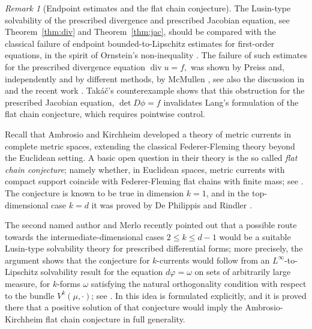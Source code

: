 \documentclass[11pt,a4paper]{article}
\theoremstyle{definition}
\theoremstyle{remark}
\newtheorem{rem}[thm]{Remark}
\begin{document}
\begin{rem}[Endpoint estimates and the flat chain conjecture]

The Lusin-type solvability of the prescribed divergence and prescribed Jacobian equation, see Theorem~\ref{thm:div} and Theorem~\ref{thm:jac}, should be compared with the classical failure of endpoint bounded-to-Lipschitz estimates for first-order equations, in the spirit of Ornstein's non-inequality \cite{Ornstein}.
The failure of such estimates for the prescribed divergence equation
$\operatorname{div} u = f,
$ was shown by Preiss \cite{Preiss1997} and, independently and by different methods, by McMullen \cite{McMullen1998}, see also the discussion in \cite{DFT03} and the recent work \cite{DePauw2026}. 
Tak\'a\v{c}'s counterexample \cite{Takac} shows that this obstruction for the prescribed Jacobian equation, $\det D\phi = f$ invalidates Lang's formulation of the flat chain conjecture, which requires pointwise control.

Recall that Ambrosio and Kirchheim \cite{AK00} developed a theory of metric currents in complete metric spaces, extending the classical Federer-Fleming theory beyond the Euclidean setting.
A basic open question in their theory is the so called \emph{flat chain conjecture}; namely whether, in Euclidean spaces, metric currents with compact support coincide with Federer-Fleming flat chains with finite mass; see \cite[Section~11]{AK00}.
The conjecture is known to be true in dimension $k=1$, and in the top-dimensional case $k=d$ it was proved by De Philippis and Rindler \cite[Theorem~1.15]{DPR}.

The second named author and Merlo recently pointed out that a possible route towards the intermediate-dimensional cases $2\le k\le d-1$ would be a suitable Lusin-type solvability theory for prescribed differential forms; more precisely, the argument shows that the conjecture for $k$-currents would follow from an $L^\infty$-to-Lipschitz solvability result for the equation
$d\varphi=\omega$
on sets of arbitrarily large measure, for $k$-forms $\omega$ satisfying the natural orthogonality condition with respect to the bundle $V^k(\mu,\cdot)$; see \cite[Remark~4.1]{MM}.
In \cite[Conjecture~4.1 and Section~4]{DMM} this idea is formulated explicitly, and it is proved there that a positive solution of that conjecture would imply the Ambrosio-Kirchheim flat chain conjecture in full generality.



\end{rem}
\end{document}
